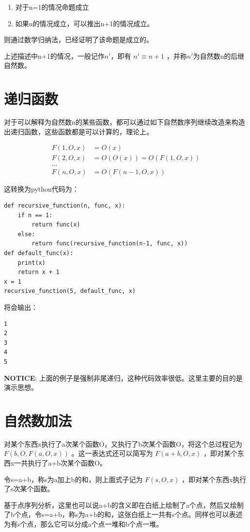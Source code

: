 \documentclass[12pt,oneside]{book}
\begin{document}
\begin{enumerate}
\item 对于n=1的情况命题成立
\item 如果n的情况成立，可以推出n+1的情况成立。
\end{enumerate}

则通过数学归纳法，已经证明了该命题是成立的。

上述描述中n+1的情况，一般记作$n'$，即有 $n'\equiv n+1$ ，并称$n'$为自然数n的后继自然数。


\section{递归函数}
对于可以解释为自然数n的某些函数，都可以通过如下自然数序列继续改造来构造出递归函数，这些函数都是可以计算的，理论上。

\begin{align*}
F(1, O, x) &= O(x)\\
F(2, O, x) &= O(O(x)) = O(F(1, O, x))\\
...\\
F(n, O, x) &= O(F(n-1, O, x))
\end{align*}

这转换为python代码为：
\begin{verbatim}
def recursive_function(n, func, x):
    if n == 1:
        return func(x)
    else:
        return func(recursive_function(n-1, func, x))
def default_func(x):
    print(x)
    return x + 1
x = 1
recursive_function(5, default_func, x)
\end{verbatim}

将会输出：
\begin{Verbatim}
1
2
3
4
5
\end{Verbatim}

\textbf{NOTICE}: 上面的例子是强制非尾递归，这种代码效率很低。这里主要的目的是演示思想。

\section{自然数加法}
对某个东西x执行了a次某个函数O，又执行了b次某个函数O，将这个总过程记为 $F(b, O, F(a, O, x))$ 。这一表达式还可以简写为 $F(a+b, O, x)$ ，即对某个东西x一共执行了a+b次某个函数O。

令s=a+b，称s为a加上b的和，则上面式子记为 $F(s, O, x)$ ，即对某个东西x执行了s次某个函数。

基于点序列分析，这里也可以说a+b的含义即在白纸上绘制了a个点，然后又绘制了b个点，令s=a+b，称s为a+b的和，这张白纸上一共有s个点。同样也可以表述为有s个点，那么它可以分成a个点一堆和b个点一堆。
\end{document}
